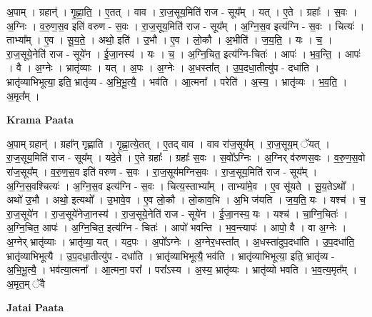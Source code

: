 \documentclass[17pt]{extarticle}
\begin{document}
अ॒पाम् । ग्रहान्॑ । गृ॒ह्णा॒ति॒ । ए॒तत् । वाव । रा॒ज॒सूय॒मिति॑ राज - सूय᳚म् । यत् । ए॒ते । ग्रहाः᳚ । स॒वः । अ॒ग्निः । व॒रु॒ण॒स॒व इति॑ वरुण - स॒वः । रा॒ज॒सूय॒मिति॑ राज - सूय᳚म् । अ॒ग्नि॒स॒व इत्य॑ग्नि - स॒वः । चित्यः॑ । ताभ्या᳚म् । ए॒व । सू॒य॒ते॒ । अथो॒ इति॑ । उ॒भौ । ए॒व । लो॒कौ । अ॒भीति॑ । ज॒य॒ति॒ । यः । च॒ । रा॒ज॒सूये॒नेति॑ राज - सूये॑न । ई॒जा॒नस्य॑ । यः । च॒ । अ॒ग्नि॒चित॒ इत्य॑ग्नि-चितः॑ । आपः॑ । भ॒व॒न्ति॒ । आपः॑ । वै । अ॒ग्नेः । भ्रातृ॑व्याः । यत् । अ॒पः । अ॒ग्नेः । अ॒धस्ता᳚त् । उ॒प॒दधा॒तीत्यु॑प - दधा॑ति । भ्रातृ॑व्याभिभूत्या॒ इति॒ भ्रातृ॑व्य - अ॒भि॒भू॒त्यै॒ । भव॑ति । आ॒त्मना᳚ । परेति॑ । अ॒स्य॒ । भ्रातृ॑व्यः । भ॒व॒ति॒ । अ॒मृत᳚म् ।  \newline


\textbf{Krama Paata} \newline

अ॒पाम् ग्रहान्॑ । ग्रहा᳚न् गृह्णाति । गृ॒ह्णा॒त्ये॒तत् । ए॒तद् वाव । वाव रा॑ज॒सूय᳚म् । रा॒ज॒सूय॒म् ॅयत् । रा॒ज॒सूय॒मिति॑ राज - सूय᳚म् । यदे॒ते । ए॒ते ग्रहाः᳚ । ग्रहाः᳚ स॒वः । स॒वो᳚ऽग्निः । अ॒ग्निर् व॑रुणस॒वः । व॒रु॒ण॒स॒वो रा॑ज॒सूय᳚म् । व॒रु॒ण॒स॒व इति॑ वरुण - स॒वः । रा॒ज॒सूय॑मग्निस॒वः । रा॒ज॒सूय॒मिति॑ राज - सूय᳚म् । अ॒ग्नि॒स॒वश्चित्यः॑ । अ॒ग्नि॒स॒व इत्य॑ग्नि - स॒वः । चित्य॒स्ताभ्या᳚म् । ताभ्या॑मे॒व । ए॒व सू॑यते । सू॒य॒तेऽथो᳚ । अथो॑ उ॒भौ । अथो॒ इत्यथो᳚ । उ॒भावे॒व । ए॒व लो॒कौ । लो॒काव॒भि । अ॒भि ज॑यति । ज॒य॒ति॒ यः । यश्च॑ । च॒ रा॒ज॒सूये॑न । रा॒ज॒सूये॑नेजा॒नस्य॑ । रा॒ज॒सूये॒नेति॑ राज - सूये॑न । ई॒जा॒नस्य॒ यः । यश्च॑ । चा॒ग्नि॒चितः॑ । अ॒ग्नि॒चित॒ आपः॑ । अ॒ग्नि॒चित॒ इत्य॑ग्नि - चितः॑ । आपो॑ भवन्ति । भ॒व॒न्त्यापः॑ । आपो॒ वै । वा अ॒ग्नेः । अ॒ग्नेर् भ्रातृ॑व्याः । भ्रातृ॑व्या॒ यत् । यद॒पः । अ॒पो᳚ऽग्नेः । अ॒ग्नेर॒धस्ता᳚त् । अ॒धस्ता॑दुप॒दधा॑ति । उ॒प॒दधा॑ति॒ भ्रातृ॑व्याभिभूत्यै । उ॒प॒दधा॒तीत्यु॑प - दधा॑ति । भ्रातृ॑व्याभिभूत्यै॒ भव॑ति । भ्रातृ॑व्याभिभूत्या॒ इति॒ भ्रातृ॑व्य - अ॒भि॒भू॒त्यै॒ । भव॑त्या॒त्मना᳚ । आ॒त्मना॒ परा᳚ । परा᳚ऽस्य । अ॒स्य॒ भ्रातृ॑व्यः । भ्रातृ॑व्यो भवति । भ॒व॒त्य॒मृत᳚म् । अ॒मृत॒म् ॅवै \newline

\textbf{Jatai Paata} \newline
\end{document}
